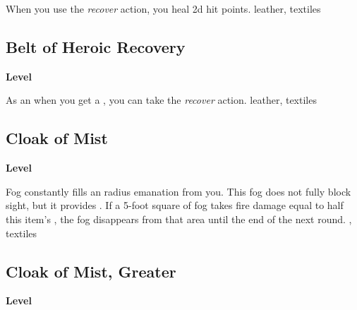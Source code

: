 \vspace{-1.5em}  %
When you use the \textit{recover} action, you heal \plus2d hit points.
 
 leather, textiles
\begin{multicols}{2}
\lowercase{\hypertarget{item:Belt of Heroic Recovery}{}}\label{item:Belt of Heroic Recovery}
\hypertarget{item:Belt of Heroic Recovery}{\subsection{Belt of Heroic Recovery}}
\columnbreak%
\begin{flushright}
\large\textbf{ Level}
\end{flushright}
\end{multicols}
\vspace{-1.5em}  %
As an  when you get a , you can take the \textit{recover} action.
 
 leather, textiles
\begin{multicols}{2}
\lowercase{\hypertarget{item:Cloak of Mist}{}}\label{item:Cloak of Mist}
\hypertarget{item:Cloak of Mist}{\subsection{Cloak of Mist}}
\columnbreak%
\begin{flushright}
\large\textbf{ Level}
\end{flushright}
\end{multicols}
\vspace{-1.5em}  %
Fog constantly fills an \areamed radius emanation from you.
This fog does not fully block sight, but it provides \concealment.
If a 5-foot square of fog takes fire damage equal to half this item's , the fog disappears from that area until the end of the next round.
 , 
 textiles
\begin{multicols}{2}
\lowercase{\hypertarget{item:Cloak of Mist, Greater}{}}\label{item:Cloak of Mist, Greater}
\hypertarget{item:Cloak of Mist, Greater}{\subsection{Cloak of Mist, Greater}}
\columnbreak%
\begin{flushright}
\large\textbf{ Level}
\end{flushright}
\end{multicols}
